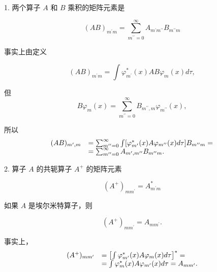 1. 两个算子 $A$ 和 $B$ 乘积的矩阵元素是

\begin{equation*}
(A B) _ {m ^ {\prime} m} = \sum_ {m ^ {\prime \prime} = 0} ^ {\infty} A _ {m ^ {\prime} m ^ {\prime \prime}} B _ {m ^ {\prime \prime} m}
\end{equation*}

事实上由定义

\begin{equation*}
(A B) _ {m ^ {\prime} m} = \int \varphi_ {m ^ {\prime}} ^ {*} (x) A B \varphi_ {m} (x) d \tau ,
\end{equation*}

但
\begin{equation*}
B \varphi_ {m} (x) = \sum_ {m ^ {\prime \prime} = 0} ^ {\infty} B _ {m ^ {\prime \prime}, m} \varphi_ {m ^ {\prime \prime}} (x),
\end{equation*}

所以
\begin{equation*}
\begin{array}{r l} (A B) _ {m ^ {\prime}, m} & = \sum_ {m ^ {\prime \prime} = 0} ^ {\infty} \int [ \varphi_ {m ^ {\prime}} ^ {*} (x) A \varphi_ {m ^ {\prime \prime}} (x) d \tau ] B _ {m ^ {\prime \prime} m} = \\ & = \sum_ {m ^ {\prime \prime} = 0} ^ {\infty} A _ {m ^ {\prime}, m ^ {\prime \prime}} B _ {m ^ {\prime \prime} m}. \end{array}
\end{equation*}

2. 算子 $A$ 的共轭算子 $A^{+}$ 的矩阵元素

\begin{equation*}
\left(A ^ {+}\right) _ {m m ^ {\prime}} = A _ {m ^ {\prime} m} ^ {*}
\end{equation*}

如果 $A$ 是埃尔米特算子，则

\begin{equation*}
\left(A ^ {+}\right) _ {m m ^ {\prime}} = A _ {m m ^ {\prime}}.
\end{equation*}

事实上，
\begin{equation*}
\begin{array}{r l} (A ^ {+}) _ {m m ^ {\prime}} & = \left[ \int \varphi_ {m ^ {\prime}} ^ {*} (x) A \varphi_ {m} (x) d \tau \right] ^ {*} = \\ & = \int \varphi_ {m} ^ {*} (x) A \varphi_ {m ^ {\prime}} (x) d \tau = A _ {m m ^ {\prime}}. \end{array}
\end{equation*}

